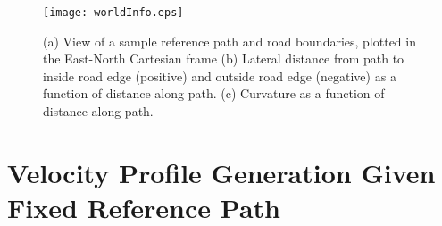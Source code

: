 \begin{figure}
\centering
\texttt{[image: worldInfo.eps]}
\caption[View of sample reference path and road boundaries]{(a) View of a sample reference path and road boundaries, plotted in the East-North Cartesian frame (b) Lateral distance from path to inside road edge (positive) and outside road edge (negative) as a function
of distance along path. (c) Curvature as a function of distance along path.}
\label{fig:worldInfo}
\end{figure}

\section{Velocity Profile Generation Given Fixed \newline Reference Path}
\label{sec:VP}

